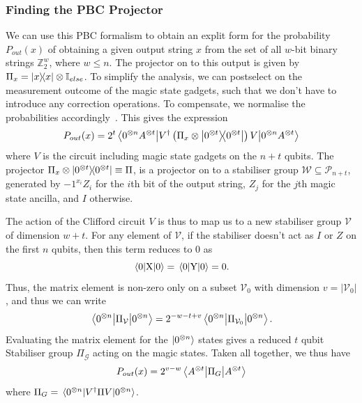 \documentclass{standalone}
\begin{document}
\subsubsection*{Finding the PBC Projector}\label{sec:pbcproj}
We can use this PBC formalism to obtain an explit form for the probability $P_{out}(x)$ of obtaining a given output string $x$ from the set of all $w$-bit binary strings $\mathbb{Z}_{2}^{w}$, where $w\leq n$. The projector on to this output is given by $\Pi_{x} = \ketbra{x}{x}\otimes\mathbb{I}_{else}$. To simplify the analysis, we can postselect on the measurement outcome of the magic state gadgets, such that we don't have to introduce any correction operations. To compensate, we normalise the probabilities accordingly~\cite{Bravyi2015}. This gives the expression
\begin{equation}
P_{out}(x) = 2^{t}\matrixel{0^{\otimes n}A^{\otimes t}}{V^{\dagger}\left(\Pi_{x}\otimes\ketbra{0^{\otimes t}}{0^{\otimes t}}\right)V}{0^{\otimes n}A^{\otimes t}}
\end{equation}
where $V$ is the circuit including magic state gadgets on the $n+t$ qubits. The projector $\Pi_{x}\otimes\ketbra{0^{\otimes t}}{0^{\otimes t}}\equiv\Pi$, is a projector on to a stabiliser group $\mathcal{W}\subseteq\mathcal{P}_{n+t}$, generated by $-1^{x_{i}}Z_{i}$ for the $i$th bit of the output string, $Z_{j}$ for the $j$th magic state ancilla, and $I$ otherwise.
\par
The action of the Clifford circuit $V$ is thus to map us to a new stabiliser group $\mathcal{V}$ of dimension $w+t$. For any element of $\mathcal{V}$, if the stabiliser doesn't act as $I$ or $Z$ on the first $n$ qubits, then this term reduces to $0$ as 
\[\matrixel{0}{\text{X}}{0}=\matrixel{0}{\text{Y}}{0}=0.\]
Thus, the matrix element is non-zero only on a subset $\mathcal{V}_{0}$ with dimension $v=\vert\mathcal{V}_{0}\vert$, and thus we can write
\begin{equation}
    \matrixel{0^{\otimes n}}{\Pi_{\mathcal{V}}}{0^{\otimes n}} = 2^{-w-t+v}\matrixel{0^{\otimes n}}{\Pi_{\mathcal{V}_{0}}}{0^{\otimes n}}.
\end{equation}
Evaluating the matrix element for the $\ket{0^{\otimes n}}$ states gives a reduced $t$ qubit Stabiliser group $\Pi_{\mathcal{G}}$ acting on the magic states. Taken all together, we thus have 
\begin{equation}
    P_{out}(x) = 2^{v-w}\matrixel{A^{\otimes t}}{\Pi_{G}}{A^{\otimes t}}
\end{equation}
where $\Pi_{G}=\matrixel{0^{\otimes n}}{V^{\dagger}\Pi V}{0^{\otimes n}}$. 
\end{document}
